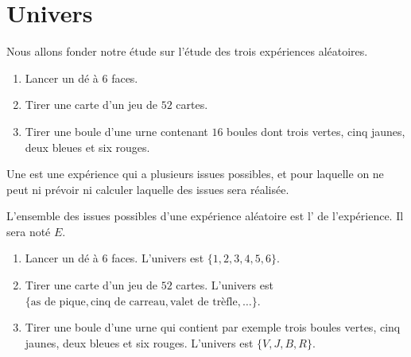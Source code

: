 
\section{Univers}

Nous allons fonder notre étude sur l'étude des trois expériences aléatoires.
\begin{enumerate}
    \item
        Lancer un dé à \( 6\) faces.
    \item
        Tirer une carte d'un jeu de \( 52\) cartes.
    \item
        Tirer une boule d'une urne contenant \( 16\) boules dont trois vertes, cinq jaunes, deux bleues et six rouges.
\end{enumerate}

\begin{definition}
    Une  est une expérience qui a plusieurs issues possibles, et pour laquelle on ne peut ni prévoir ni calculer laquelle des issues sera réalisée.
\end{definition}

\begin{definition}
    L'ensemble des issues possibles d'une expérience aléatoire est l' de l'expérience. Il sera noté \( E\).
\end{definition}

\begin{enumerate}
    \item
        Lancer un dé à \( 6\) faces. L'univers est \( \{ 1,2,3,4,5,6 \}\).
    \item
        Tirer une carte d'un jeu de \( 52\) cartes. L'univers est \( \{ \text{as de pique},\text{cinq de carreau},\text{valet de trèfle}, \ldots \}\).
    \item
        Tirer une boule d'une urne qui contient par exemple trois boules vertes, cinq jaunes, deux bleues et six rouges. L'univers est \( \{ V,J,B,R \}\).
\end{enumerate}


